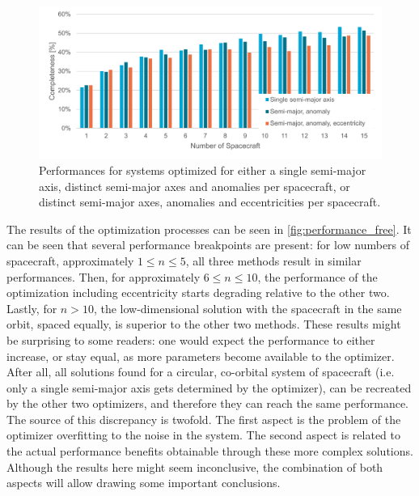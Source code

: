 \begin{figure}[htbp]
 \centering
 \includegraphics[width=1.0\textwidth]{img/performance_free.pdf}
 \caption{Performances for systems optimized for either a single semi-major axis, distinct semi-major axes and anomalies per spacecraft, or distinct semi-major axes, anomalies and eccentricities per spacecraft.}
 \label{fig:performance_free}
\end{figure}
The results of the optimization processes can be seen in \autoref{fig:performance_free}. It can be seen that several performance breakpoints are present: for low numbers of spacecraft, approximately $1 \leq n \leq 5$, all three methods result in similar performances. Then, for approximately $6 \leq n \leq 10$, the performance of the optimization including eccentricity starts degrading relative to the other two. Lastly, for $n > 10$, the low-dimensional solution with the spacecraft in the same orbit, spaced equally, is superior to the other two methods. These results might be surprising to some readers: one would expect the performance to either increase, or stay equal, as more parameters become available to the optimizer. After all, all solutions found for a circular, co-orbital system of spacecraft (i.e. only a single semi-major axis gets determined by the optimizer), can be recreated by the other two optimizers, and therefore they can reach the same performance. The source of this discrepancy is twofold. The first aspect is the problem of the optimizer overfitting to the noise in the system. The second aspect is related to the actual performance benefits obtainable through these more complex solutions. Although the results here might seem inconclusive, the combination of both aspects will allow drawing some important conclusions.\\

